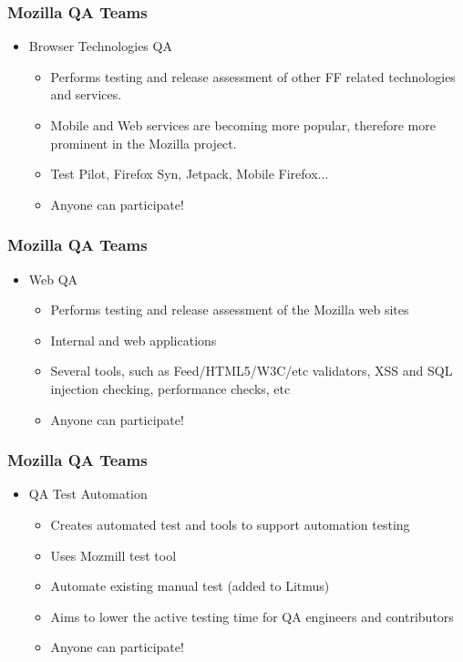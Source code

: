\documentclass{beamer}
\begin{document}

\begin{frame}
\frametitle{Mozilla QA Teams}
 \begin{itemize}
 \item Browser Technologies QA
      \begin{itemize}
      \item Performs testing and release assessment of other FF related technologies and services.
      \item Mobile and Web services are becoming more popular, therefore more prominent in the Mozilla project.
      \item Test Pilot, Firefox Syn, Jetpack, Mobile Firefox...
      \item Anyone can participate!
      \end{itemize}
 \end{itemize}
\end{frame}


\begin{frame}
\frametitle{Mozilla QA Teams}
 \begin{itemize}
 \item Web QA
      \begin{itemize}
      \item Performs testing and release assessment of the Mozilla web sites
      \item Internal and web applications
      \item Several tools, such as Feed/HTML5/W3C/etc validators, XSS and SQL injection checking, performance checks, etc
      \item Anyone can participate!
      \end{itemize}
 \end{itemize}
\end{frame}


\begin{frame}
\frametitle{Mozilla QA Teams}
 \begin{itemize}
 \item QA Test Automation
      \begin{itemize}
      \item Creates automated test and tools to support automation testing
      \item Uses Mozmill test tool
      \item Automate existing manual test (added to Litmus)
      \item Aims to lower the active testing time for QA engineers and contributors
      \item Anyone can participate!
      \end{itemize}
 \end{itemize}
\end{frame}
\end{document}
